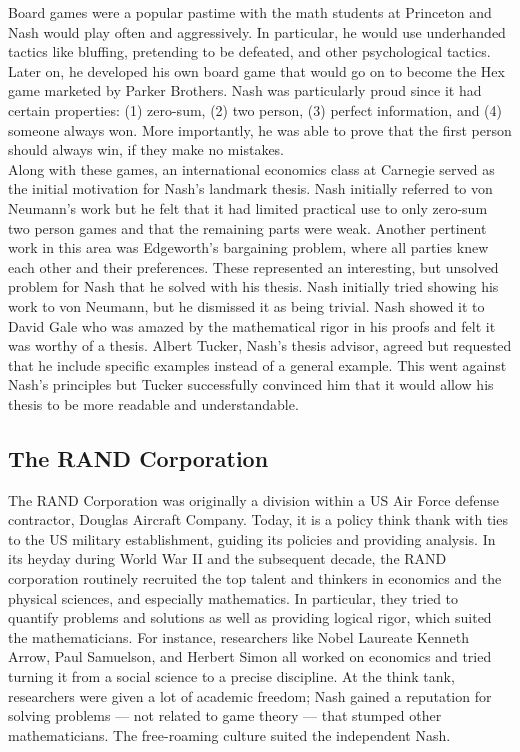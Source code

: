 \documentclass[12pt]{article}
\begin{document}
Board games were a popular pastime with the math students at Princeton and Nash would play often and aggressively. In particular, he would use underhanded tactics like bluffing, pretending to be defeated, and other psychological tactics. Later on, he developed his own board game that would go on to become the Hex game marketed by Parker Brothers. Nash was particularly proud since it had certain properties: (1) zero-sum, (2) two person, (3) perfect information, and (4) someone always won. More importantly, he was able to prove that the first person should always win, if they make no mistakes.\\

Along with these games, an international economics class at Carnegie served as the initial motivation for Nash's landmark thesis. Nash initially referred to von Neumann's work but he felt that it had limited practical use to only zero-sum two person games and that the remaining parts were weak. Another pertinent work in this area was Edgeworth's bargaining problem, where all parties knew each other and their preferences. These represented an interesting, but unsolved problem for Nash that he solved with his thesis. Nash initially tried showing his work to von Neumann, but he dismissed it as being trivial. Nash showed it to David Gale who was amazed by the mathematical rigor in his proofs and felt it was worthy of a thesis. Albert Tucker, Nash's thesis advisor, agreed but requested that he include specific examples instead of a general example. This went against Nash's principles but Tucker successfully convinced him that it would allow his thesis to be more readable and understandable. 

\subsection{The RAND Corporation}

The RAND Corporation was originally a division within a US Air Force defense contractor, Douglas Aircraft Company. Today, it is a policy think thank with ties to the US military establishment, guiding its policies and providing analysis. In its heyday during World War II and the subsequent decade, the RAND corporation routinely recruited the top talent and thinkers in economics and the physical sciences, and especially mathematics. In particular, they tried to quantify problems and solutions as well as providing logical rigor, which suited the mathematicians. For instance, researchers like Nobel Laureate Kenneth Arrow, Paul Samuelson, and Herbert Simon all worked on economics and tried turning it from a social science to a precise discipline. At the think tank, researchers were given a lot of academic freedom; Nash gained a reputation for solving problems --- not related to game theory --- that stumped other mathematicians. The free-roaming culture suited the independent Nash.\\
\end{document}
